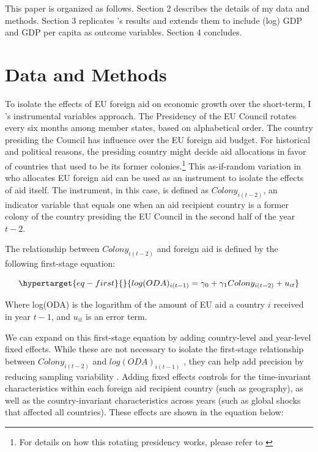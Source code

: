 \documentclass[12pt, ]{article}
\begin{document}
This paper is organized as follows. Section 2 describes the details of
my data and methods. Section 3 replicates \citet{carnegie2017foreign}'s
results and extends them to include (log) GDP and GDP per capita as
outcome variables. Section 4 concludes.

\hypertarget{data-and-methods}{%
\section{Data and Methods}\label{data-and-methods}}

To isolate the effects of EU foreign aid on economic growth over the
short-term, I \citet{carnegie2017foreign}'s instrumental variables
approach. The Presidency of the EU Council rotates every six months
among member states, based on alphabetical order. The country presiding
the Council has influence over the EU foreign aid budget. For historical
and political reasons, the presiding country might decide aid
allocations in favor of countries that used to be its former
colonies.\footnote{For details on how this rotating presidency works,
  please refer to \citet{carnegie2017foreign}} This as-if-random
variation in who allocates EU foreign aid can be used as an instrument
to isolate the effects of aid itself. The instrument, in this case, is
defined as \(Colony_{i(t-2)}\), an indicator variable that equals one
when an aid recipient country is a former colony of the country
presiding the EU Council in the second half of the year \(t-2\).

The relationship between \(Colony_{i(t-2)}\) and foreign aid is defined
by the following first-stage equation:

\begin{equation}\protect\hypertarget{eq-first}{}{
log(ODA)_{i(t-1)} = \gamma_{0} + \gamma_{1}Colony_{i(t-2)} + u_{it}
}\label{eq-first}\end{equation}

Where log(ODA) is the logarithm of the amount of EU aid a country \(i\)
received in year \(t-1\), and \(u_{it}\) is an error term.

We can expand on this first-stage equation by adding country-level and
year-level fixed effects. While these are not necessary to isolate the
first-stage relationship between \(Colony_{i(t-2)}\) and
\(log(ODA)_{i(t-1)}\) , they can help add precision by reducing sampling
variability \citep{carnegie2017foreign}. Adding fixed effects controls
for the time-invariant characteristics within each foreign aid recipient
country (such as geography), as well as the country-invariant
characteristics across years (such as global shocks that affected all
countries). These effects are shown in the equation below:
\end{document}
